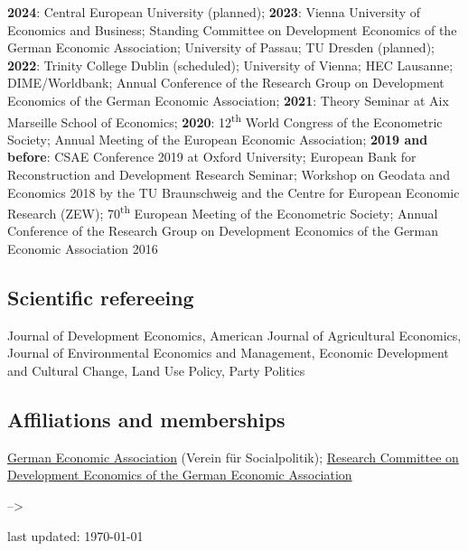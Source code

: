\documentclass[
  a4paper, 10pt]{article}
\begin{document}
\textbf{2024}: Central European University (planned); \textbf{2023}:
Vienna University of Economics and Business; Standing Committee on
Development Economics of the German Economic Association; University of
Passau; TU Dresden (planned); \textbf{2022}: Trinity College Dublin
(scheduled); University of Vienna; HEC Lausanne; DIME/Worldbank; Annual
Conference of the Research Group on Development Economics of the German
Economic Association; \textbf{2021}: Theory Seminar at Aix Marseille
School of Economics; \textbf{2020}: 12\textsuperscript{th} World
Congress of the Econometric Society; Annual Meeting of the European
Economic Association; \textbf{2019 and before}: CSAE Conference 2019 at
Oxford University; European Bank for Reconstruction and Development
Research Seminar; Workshop on Geodata and Economics 2018 by the TU
Braunschweig and the Centre for European Economic Research (ZEW);
70\textsuperscript{th} European Meeting of the Econometric Society;
Annual Conference of the Research Group on Development Economics of the
German Economic Association 2016

\hypertarget{scientific-refereeing}{%
\subsection{Scientific refereeing}\label{scientific-refereeing}}

Journal of Development Economics, American Journal of Agricultural
Economics, Journal of Environmental Economics and Management, Economic
Development and Cultural Change, Land Use Policy, Party Politics

\hypertarget{affiliations-and-memberships}{%
\subsection{Affiliations and
memberships}\label{affiliations-and-memberships}}

\href{https://www.socialpolitik.de/}{German Economic Association}
(Verein für Socialpolitik);
\href{http://entwicklungsoekonomischer-ausschuss.de/?lang=en}{Research
Committee on Development Economics of the German Economic Association}

--\textgreater{}

\vfill\hfill\tiny last updated: \today
\end{document}
